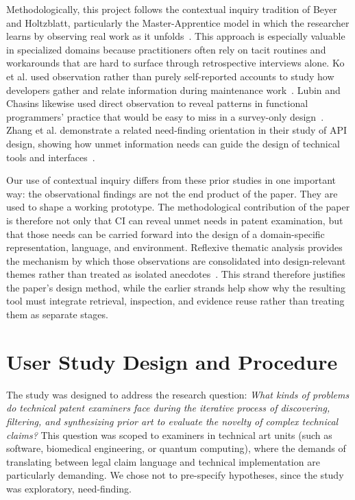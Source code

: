 \documentclass[sigconf]{acmart}
\begin{document}
Methodologically, this project follows the contextual inquiry tradition of
Beyer and Holtzblatt, particularly the Master-Apprentice model in which the
researcher learns by observing real work as it unfolds~\cite{Beyer1997}. This
approach is especially valuable in specialized domains because practitioners
often rely on tacit routines and workarounds that are hard to surface through
retrospective interviews alone. Ko et al. used observation rather than purely
self-reported accounts to study how developers gather and relate information
during maintenance work~\cite{Ko2006}. Lubin and Chasins likewise used direct
observation to reveal patterns in functional programmers' practice that would be
easy to miss in a survey-only design~\cite{Lubin2021}. Zhang et al.
demonstrate a related need-finding orientation in their study of API design,
showing how unmet information needs can guide the design of technical tools and
interfaces~\cite{Zhang2020}.

Our use of contextual inquiry differs from these prior studies in one important
way: the observational findings are not the end product of the paper. They are
used to shape a working prototype. The methodological contribution of the paper
is therefore not only that CI can reveal unmet needs in patent examination, but
that those needs can be carried forward into the design of a domain-specific
representation, language, and environment. Reflexive thematic analysis provides
the mechanism by which those observations are consolidated into design-relevant
themes rather than treated as isolated anecdotes~\cite{Braun2006}. This strand
therefore justifies the paper's design method, while the earlier strands help
show why the resulting tool must integrate retrieval, inspection, and evidence
reuse rather than treating them as separate stages.


\section{User Study Design and Procedure}

The study was designed to address the research question: \emph{What kinds of
problems do technical patent examiners face during the iterative process of
discovering, filtering, and synthesizing prior art to evaluate the novelty of
complex technical claims?} This question was scoped to examiners in technical
art units (such as software, biomedical engineering, or quantum computing),
where the demands of translating between legal claim language and technical
implementation are particularly demanding. We chose not to pre-specify
hypotheses, since the study was exploratory, need-finding.
\end{document}
